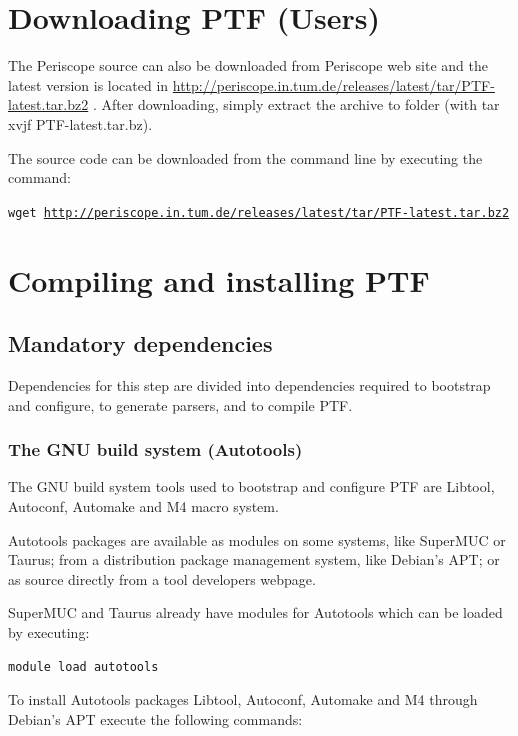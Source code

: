 \documentclass[11pt,a4paper, oneside]{book} %
\newcommand{\ptftarball}{\url{http://periscope.in.tum.de/releases/latest/tar/PTF-latest.tar.bz2} }
\begin{document}
\section {Downloading PTF (Users)}

The Periscope source can also be downloaded from Periscope web site and the
latest version is located in \ptftarball. After downloading, simply extract the
archive to folder (with tar xvjf PTF-latest.tar.bz).

The source code can be downloaded from the command line by executing the
command:

\texttt{wget \ptftarball}

\section{Compiling and installing PTF}

\subsection{Mandatory dependencies}

Dependencies for this step are divided into dependencies required to bootstrap
and configure, to generate parsers, and to compile PTF.


\subsubsection{The GNU build system (Autotools)}

The GNU build system tools used to bootstrap and configure PTF are Libtool,
Autoconf, Automake and M4 macro system.

Autotools packages are available as modules on some systems, like SuperMUC or
Taurus; from a distribution package management system, like Debian's APT; or as
source directly from a tool developers webpage.

SuperMUC and Taurus already have modules for Autotools which can be loaded by
executing:

\texttt{module load autotools}

To install Autotools packages Libtool, Autoconf, Automake and M4 through Debian's
APT execute the following commands:
\end{document}
